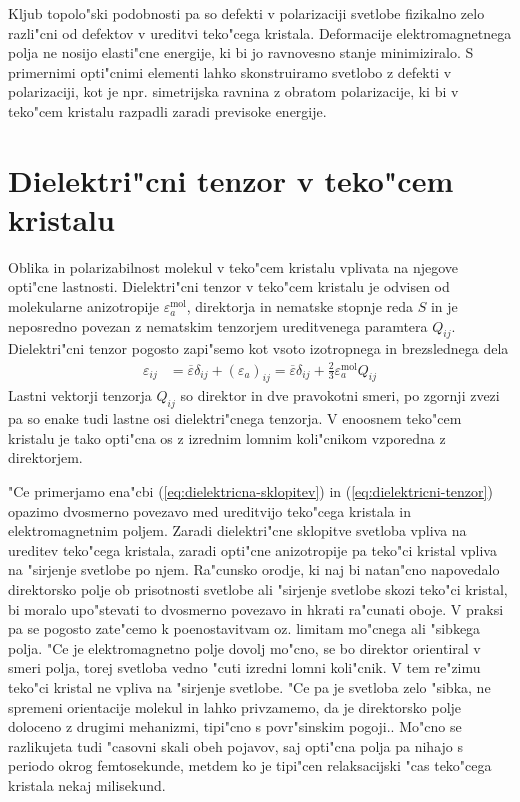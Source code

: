 \documentclass[12pt,twoside,openright,final]{report}
\begin{document}
Kljub topolo"ski podobnosti pa so defekti v polarizaciji svetlobe fizikalno zelo razli"cni od defektov v ureditvi teko"cega kristala. 
Deformacije elektromagnetnega polja ne nosijo elasti"cne energije, ki bi jo ravnovesno stanje minimiziralo. 
S primernimi opti"cnimi elementi lahko skonstruiramo svetlobo z defekti v polarizaciji, kot je npr. simetrijska ravnina z obratom polarizacije, ki bi v teko"cem kristalu razpadli zaradi previsoke energije. 

\section{Dielektri"cni tenzor v teko"cem kristalu}
\label{sec:dielektricnost}
Oblika in polarizabilnost molekul v teko"cem kristalu vplivata na njegove opti"cne lastnosti. 
Dielektri"cni tenzor v teko"cem kristalu je odvisen od molekularne anizotropije $\varepsilon_{a}^{\mathrm{mol}}$, direktorja in nematske stopnje reda $S$ in je neposredno povezan z nematskim tenzorjem ureditvenega paramtera $Q_{ij}$.
Dielektri"cni tenzor pogosto zapi"semo kot vsoto izotropnega in brezslednega dela \cite{degennes, ravnik-zumer-ldg}
\begin{align}
\label{eq:dielektricni-tenzor}
 \varepsilon_{ij} &= \overline\varepsilon \delta_{ij} + (\varepsilon_a)_{ij} = \overline\varepsilon\delta_{ij} + \frac{2}{3}\varepsilon_a^{\mathrm{mol}} Q_{ij}
\end{align}
Lastni vektorji tenzorja $Q_{ij}$ so direktor in dve pravokotni smeri, po zgornji zvezi pa so enake tudi lastne osi dielektri"cnega tenzorja. 
V enoosnem teko"cem kristalu je tako opti"cna os z izrednim lomnim koli"cnikom vzporedna z direktorjem. 

"Ce primerjamo ena"cbi (\ref{eq:dielektricna-sklopitev}) in (\ref{eq:dielektricni-tenzor}) opazimo dvosmerno povezavo med ureditvijo teko"cega kristala in elektromagnetnim poljem. 
Zaradi dielektri"cne sklopitve svetloba vpliva na ureditev teko"cega kristala, zaradi opti"cne anizotropije pa teko"ci kristal vpliva na "sirjenje svetlobe po njem. 
Ra"cunsko orodje, ki naj bi natan"cno napovedalo direktorsko polje ob prisotnosti svetlobe ali "sirjenje svetlobe skozi teko"ci kristal, bi moralo upo"stevati to dvosmerno povezavo in hkrati ra"cunati oboje. 
V praksi pa se pogosto zate"cemo k poenostavitvam oz. limitam mo"cnega ali "sibkega polja. 
"Ce je elektromagnetno polje dovolj mo"cno, se bo direktor orientiral v smeri polja, torej svetloba vedno "cuti izredni lomni koli"cnik. 
V tem re"zimu teko"ci kristal ne vpliva na "sirjenje svetlobe. 
"Ce pa je svetloba zelo "sibka, ne spremeni orientacije molekul in lahko privzamemo, da je direktorsko polje doloceno z drugimi mehanizmi, tipi"cno s povr"sinskim pogoji.. 
Mo"cno se razlikujeta tudi "casovni skali obeh pojavov, saj opti"cna polja pa nihajo s periodo okrog femtosekunde, metdem ko je tipi"cen relaksacijski "cas teko"cega kristala nekaj milisekund. 
\end{document}
